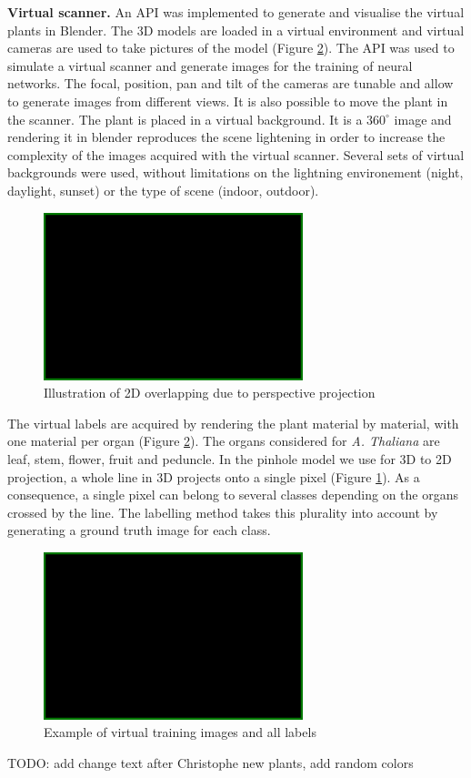 \textbf{Virtual scanner.} An API was implemented to generate and visualise the virtual plants in Blender. The 3D models are loaded in a virtual environment and virtual cameras are used to take pictures of the model (Figure \ref{fig:plants}). The API was used to simulate a virtual scanner and generate images for the training of neural networks. The focal, position, pan and tilt of the cameras are tunable and allow to generate images from different views. It is also possible to move the plant in the scanner. The plant is placed in a virtual background. It is a $360^{\circ}$ image and rendering it in blender reproduces the scene lightening in order to increase the complexity of the images acquired with the virtual scanner. Several sets of virtual backgrounds were used, without limitations on the lightning environement (night, daylight, sunset) or the type of scene (indoor, outdoor).


\begin{figure}[h]
	\centering
	\includegraphics[width=0.1\linewidth]{figures/blank.png}
	\caption{Illustration of 2D overlapping due to perspective projection }
	\label{fig:pinhole}
\end{figure}

The virtual labels are acquired by rendering the plant material by material, with one material per organ (Figure \ref{fig:plants}). The organs considered for \textit{A. Thaliana} are leaf, stem, flower, fruit and peduncle. In the pinhole model \cite{} we use for 3D to 2D projection, a whole line in 3D projects onto a single pixel (Figure \ref{fig:pinhole}). As a consequence, a single pixel can belong to several classes depending on the organs crossed by the line. The labelling method takes this plurality into account by generating a ground truth image for each class. 
\begin{figure}[h]
	\centering
	\includegraphics[width=0.1\linewidth]{figures/blank.png}
	\caption{Example of virtual training images and all labels}
	\label{fig:plants}
\end{figure}

TODO: add change text after Christophe new plants, add random colors\\



